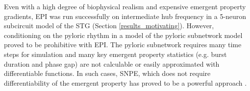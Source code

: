 \documentclass[11pt]{article}
\begin{document}
Even with a high degree of biophysical realism and expensive emergent property gradients, EPI was run successfully on intermediate hub frequency in a 5-neuron subcircuit model of the STG (Section \ref{results_motivating}).
However, conditioning on the pyloric rhythm \cite{marder1992dynamic} in a model of the pyloric subnetwork model \cite{prinz2004similar} proved to be prohibitive with EPI.
The pyloric subnetwork requires many time steps for simulation and many key emergent property statistics (e.g. burst duration and phase gap) are not calculable or easily approximated with differentiable functions.
In such cases, SNPE, which does not require differentiability of the emergent property has proved to be a powerful approach \cite{gonccalves2019training}.

%
\end{document}

